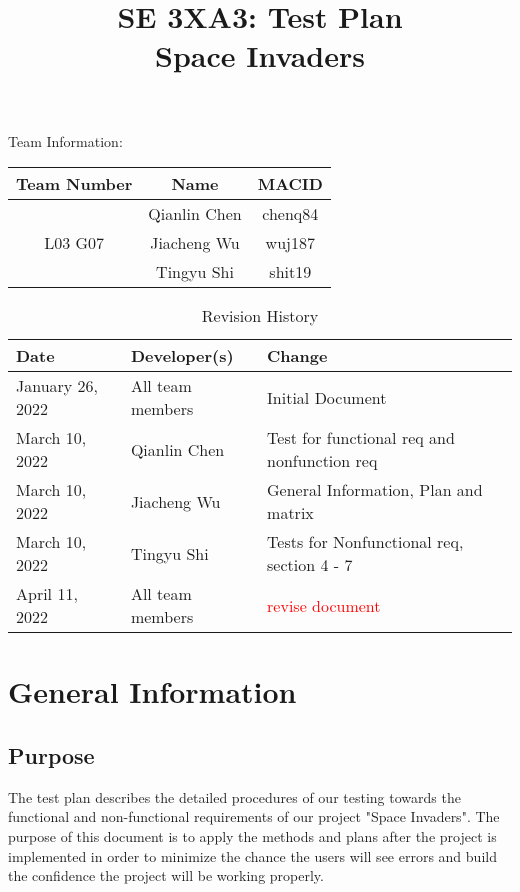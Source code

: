 \documentclass[12pt]{article}
\title{SE 3XA3: Test Plan\\Space Invaders}
\begin{document}
\maketitle

{\Large Team Information:}
\begin{table}[htp]
\centering
{\Large
\begin{tabular}{|c|c|c|}
\hline
\multicolumn{1}{|l|}{Team Number} & Name         & MACID   \\ \hline
\multirow{3}{*}{L03 G07}          & Qianlin Chen & chenq84 \\ \cline{2-3} 
                                  & Jiacheng Wu  & wuj187  \\ \cline{2-3} 
                                  & Tingyu Shi   & shit19  \\ \hline
\end{tabular}
}
\end{table}

\newpage
\begin{table}[htp]
\caption{Revision History} 
\begin{tabularx}{\textwidth}{llX}
\toprule
\textbf{Date} & \textbf{Developer(s)} & \textbf{Change}\\
\midrule
January 26, 2022 & All team members & Initial Document\\
March 10, 2022 & Qianlin Chen & Test for functional req and nonfunction req\\
March 10, 2022 & Jiacheng Wu & General Information, Plan and matrix\\
March 10, 2022 & Tingyu Shi & Tests for Nonfunctional req, section 4 - 7\\
April 11, 2022 & All team members & \textcolor{red}{revise document}\\
\bottomrule
\end{tabularx}
\end{table}
\newpage
\tableofcontents
\listoftables
\listoffigures
\cleardoublepage
\section{General Information}
\subsection{Purpose}
The test plan describes the detailed procedures of our testing towards the functional and non-functional requirements of our project "Space Invaders". The purpose of this document is to apply the methods and plans after the project is implemented in order to minimize the chance the users will see errors and build the confidence the project will be working properly.
\end{document}

